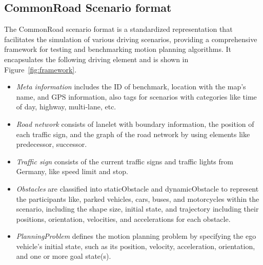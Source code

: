 \subsection{CommonRoad Scenario format}
The CommonRoad scenario format is a standardized representation that facilitates the simulation of various driving scenarios, providing a comprehensive framework for testing and benchmarking motion planning algorithms. It encapsulates the following driving element and is shown in Figure~\ref{fig:framework}.
\begin{itemize}
    \item \textit{Meta information} includes the ID of benchmark,  location with the map's name, and GPS information, also tags for scenarios with categories like time of day, highway, multi-lane, etc.
    \item \textit{Road network} consists of lanelet with boundary information, the position of each traffic sign, and the graph of the road network by using elements like predecessor, successor.
     \item \textit{Traffic sign} consists of the current traffic signs and traffic lights from Germany, like speed limit and stop. 
    \item \textit{Obstacles} are classified into staticObstacle and dynamicObstacle to represent the participants like, parked vehicles, cars, buses, and motorcycles within the scenario, including the shape size, initial state, and trajectory including their positions, orientation, velocities, and accelerations for each obstacle.
    \item \textit{PlanningProblem} defines the motion planning problem by specifying the ego vehicle's initial state, such as its position, velocity, acceleration, orientation, and one or more goal state(s).
\end{itemize}

